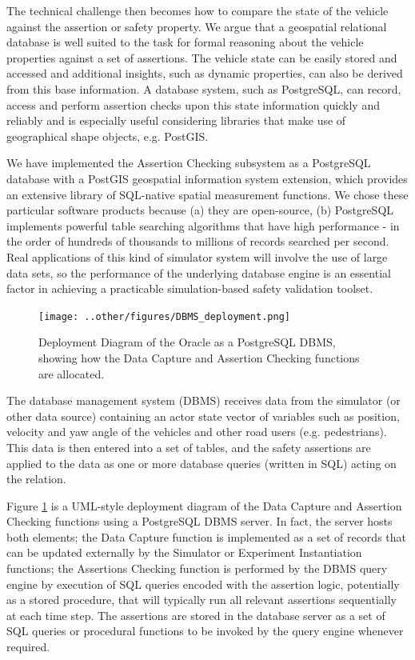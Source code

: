The technical challenge then becomes how to compare the state of the vehicle against the assertion or safety property. We argue that a geospatial relational database is well suited to the task for formal reasoning about the vehicle properties against a set of assertions. The vehicle state can be easily stored and accessed and additional insights, such as dynamic properties, can also be derived from this base information. A database system, such as PostgreSQL, can record, access and perform assertion checks upon this state information quickly and reliably and is especially useful considering libraries that make use of geographical shape objects, e.g. PostGIS. 

We have implemented the Assertion Checking subsystem as a PostgreSQL database with a PostGIS geospatial information system extension, which provides an extensive library of SQL-native spatial measurement functions. We chose these particular software products because (a) they are open-source, (b) PostgreSQL implements powerful table searching algorithms that have high performance - in the order of hundreds of thousands to millions of records searched per second. Real applications of this kind of simulator system will involve the use of large data sets, so the performance of the underlying database engine is an essential factor in achieving a practicable simulation-based safety validation toolset.

\begin{figure} [h!]
    \centering
    \texttt{[image: ..other/figures/DBMS\_deployment.png]}
    \caption{Deployment Diagram of the Oracle as a PostgreSQL DBMS, showing how the Data Capture and Assertion Checking functions are allocated.}
    \label{fig:dbms_deployment}
\end{figure}

The database management system (DBMS) receives data from the simulator (or other data source) containing an actor state vector of variables such as position, velocity and yaw angle of the vehicles and other road users (e.g. pedestrians). This data is then entered into a set of tables, and the safety assertions are applied to the data as one or more database queries (written in SQL) acting on the relation.

Figure \ref{fig:dbms_deployment} is a UML-style deployment diagram of the Data Capture and Assertion Checking functions using a PostgreSQL DBMS server. In fact, the server hosts both elements; the Data Capture function is implemented as a set of records that can be updated externally by the Simulator or Experiment Instantiation functions; the Assertions Checking function is performed by the DBMS query engine by execution of SQL queries encoded with the assertion logic, potentially as a stored procedure, that will typically run all relevant assertions sequentially at each time step. The assertions are stored in the database server as a set of SQL queries or procedural functions to be invoked by the query engine whenever required.

